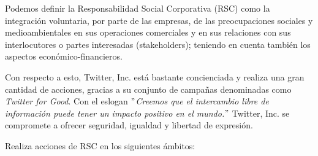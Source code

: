 Podemos definir la Responsabilidad Social Corporativa (RSC) como la integración voluntaria, por parte de las empresas, de las preocupaciones sociales y medioambientales en sus operaciones comerciales y en sus relaciones con sus interlocutores o partes interesadas (stakeholders); teniendo en cuenta también los aspectos económico-financieros. 

Con respecto a esto, Twitter, Inc. está bastante concienciada y realiza una gran cantidad de acciones, gracias a su conjunto de campañas denominadas como \textit{Twitter for Good}. Con el eslogan \textit{$"$Creemos que el intercambio libre de información puede tener un impacto positivo en el mundo.$"$} Twitter, Inc. se compromete a ofrecer seguridad, igualdad y libertad de expresión.

Realiza acciones de RSC en los siguientes ámbitos:

